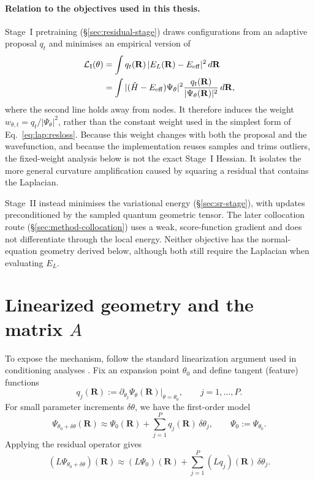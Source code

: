 \paragraph{Relation to the objectives used in this thesis.}
Stage~I pretraining (\S\ref{sec:residual-stage}) draws configurations from an adaptive
proposal $q_t$ and minimises an empirical version of
\begin{align}
\mathcal L_{\mathrm I}(\theta)
&=\int q_t(\mathbf R)\,|E_L(\mathbf R)-E_{\rm eff}|^2\,d\mathbf R \\
&=\int |(\hat H-E_{\rm eff})\Psi_\theta|^2
\frac{q_t(\mathbf R)}{|\Psi_\theta(\mathbf R)|^2}\,d\mathbf R,
\label{eq:lap:stage1-weight}
\end{align}
where the second line holds away from nodes. It therefore induces the weight
$w_{\theta,t}=q_t/|\Psi_\theta|^2$, rather than the constant weight used in the simplest
form of Eq.~\eqref{eq:lap:resloss}. Because this weight changes with both the proposal and
the wavefunction, and because the implementation reuses samples and trims outliers, the
fixed-weight analysis below is not the exact Stage~I Hessian. It isolates the more general
curvature amplification caused by squaring a residual that contains the Laplacian.

Stage~II instead minimises the variational energy (\S\ref{sec:sr-stage}), with updates
preconditioned by the sampled quantum geometric tensor. The later collocation route
(\S\ref{sec:method-collocation}) uses a weak, score-function gradient and does not
differentiate through the local energy. Neither objective has the normal-equation geometry
derived below, although both still require the Laplacian when evaluating $E_L$.

\section{Linearized geometry and the matrix \(A\)}
\label{app:laplacian:A}

To expose the mechanism, follow the standard linearization argument used in
conditioning analyses \cite{De_Ryck_2024}.
Fix an expansion point $\theta_0$ and define tangent (feature) functions
\begin{equation}
q_j(\mathbf R) := \partial_{\theta_j}\Psi_\theta(\mathbf R)\big|_{\theta=\theta_0},
\qquad j=1,\ldots,P.
\end{equation}
For small parameter increments $\delta\theta$, we have the first-order model
\begin{equation}
\Psi_{\theta_0+\delta\theta}(\mathbf R)
\approx
\Psi_0(\mathbf R)+\sum_{j=1}^P q_j(\mathbf R)\,\delta\theta_j,
\qquad
\Psi_0:=\Psi_{\theta_0}.
\label{eq:lap:linPsi}
\end{equation}
Applying the residual operator gives
\begin{equation}
(L\Psi_{\theta_0+\delta\theta})(\mathbf R)
\approx
(L\Psi_0)(\mathbf R)+\sum_{j=1}^P (Lq_j)(\mathbf R)\,\delta\theta_j.
\label{eq:lap:linRes}
\end{equation}

